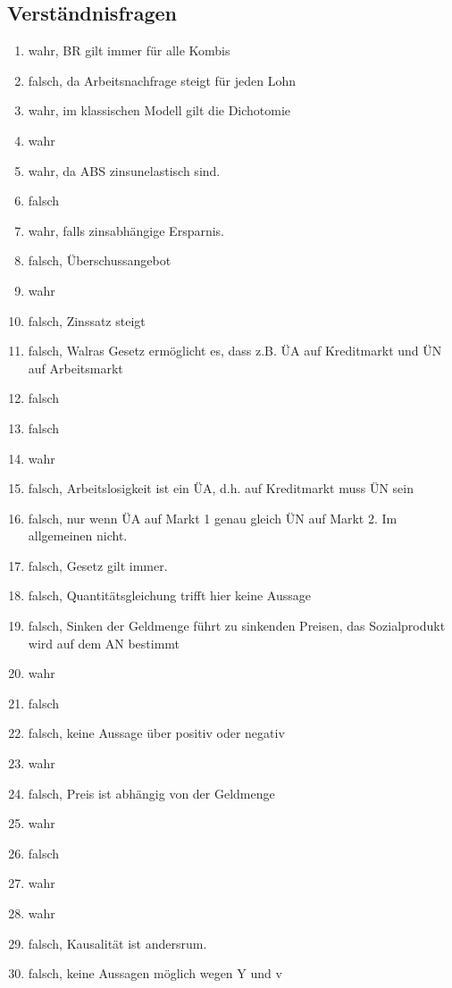 \documentclass{scrartcl}
\begin{document}
\subsection{Verst\"{a}ndnisfragen}
\begin{enumerate}
\item wahr, BR gilt immer f\"{u}r alle Kombis
\item falsch, da Arbeitsnachfrage steigt f\"{u}r jeden Lohn
\item wahr, im klassischen Modell gilt die Dichotomie
\item wahr
\item wahr, da ABS zinsunelastisch sind.
\item falsch
\item wahr, falls zinsabh\"{a}ngige Ersparnis.
\item falsch, \"{U}berschussangebot
\item wahr
\item falsch, Zinssatz steigt
\item falsch, Walras Gesetz erm\"{o}glicht es, dass z.B. \"{U}A auf Kreditmarkt und \"{U}N auf Arbeitsmarkt
\item falsch
\item falsch
\item wahr
\item falsch, Arbeitslosigkeit ist ein \"{U}A, d.h. auf Kreditmarkt muss \"{U}N sein
\item falsch, nur wenn \"{U}A auf Markt 1 genau gleich \"{U}N auf Markt 2. Im allgemeinen nicht.
\item falsch, Gesetz gilt immer.
\item falsch, Quantit\"{a}tsgleichung trifft hier keine Aussage
\item falsch, Sinken der Geldmenge f\"{u}hrt zu sinkenden Preisen, das Sozialprodukt wird auf dem AN bestimmt
\item wahr
\item falsch
\item falsch, keine Aussage \"{u}ber positiv oder negativ
\item wahr
\item falsch, Preis ist abh\"{a}ngig von der Geldmenge
\item wahr
\item falsch
\item wahr
\item wahr
\item falsch, Kausalit\"{a}t ist andersrum.
\item falsch, keine Aussagen m\"{o}glich wegen Y und v

\end{enumerate}
\end{document}
